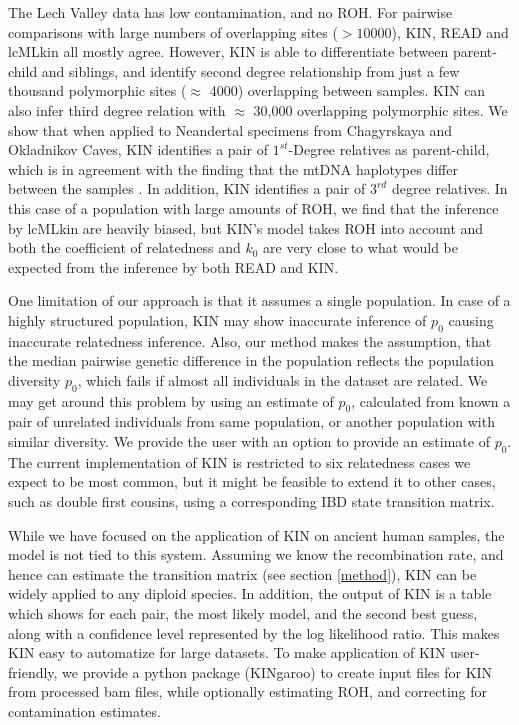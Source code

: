 \documentclass[12pt, letterpaper]{article}
\begin{document}
The Lech Valley data has low contamination, and no ROH. For pairwise comparisons with large numbers of overlapping sites ($>10000$), KIN, READ and lcMLkin all mostly agree. However, KIN is able to differentiate between parent-child and siblings, and identify second degree relationship from just a few thousand polymorphic sites ($\approx$ 4000) overlapping between samples. KIN can also infer third degree relation with $\approx$ 30,000 overlapping polymorphic sites. We show that when applied to Neandertal specimens from Chagyrskaya and Okladnikov Caves, KIN identifies a pair of $1^{st}$-Degree relatives as parent-child, which is in agreement with the finding that the mtDNA haplotypes differ between the samples \cite{laurits_skov_genetic_nodate}. In addition, KIN identifies a pair of $3^{rd}$ degree relatives. In this case of a population with large amounts of ROH, we find that the inference by lcMLkin are heavily biased, but KIN's model takes ROH into account and both the coefficient of relatedness and $k_0$ are very close to what would be expected from the inference by both READ and KIN. 

One limitation of our approach is that it assumes a single population. In case of a highly structured population, KIN may show inaccurate inference of $p_0$ causing inaccurate relatedness inference. Also, our method makes the assumption, that the median pairwise genetic difference in the population reflects the population diversity $p_0$, which fails if almost all individuals in the dataset are related. We may get around this problem by using an estimate of $p_0$, calculated from known a pair of unrelated individuals from same population, or another population with similar diversity. We provide the user with an option to provide an estimate of $p_0$. The current implementation of KIN is restricted to six relatedness cases we expect to be most common, but it might be feasible to extend it to other cases, such as double first cousins, using a corresponding IBD state transition matrix.

While we have focused on the application of KIN on ancient human samples, the model is not tied to this system. Assuming we know the recombination rate, and hence can estimate the transition matrix (see section \ref{method}), KIN can be widely applied to any diploid species. In addition, the output of KIN is a table which shows for each pair, the most likely model, and the second best guess, along with a confidence level represented by the log likelihood ratio. This makes KIN easy to automatize for large datasets. To make application of KIN user-friendly, we provide a python package (KINgaroo) to create input files for KIN from processed bam files, while optionally estimating ROH, and correcting for contamination estimates.
\end{document}
